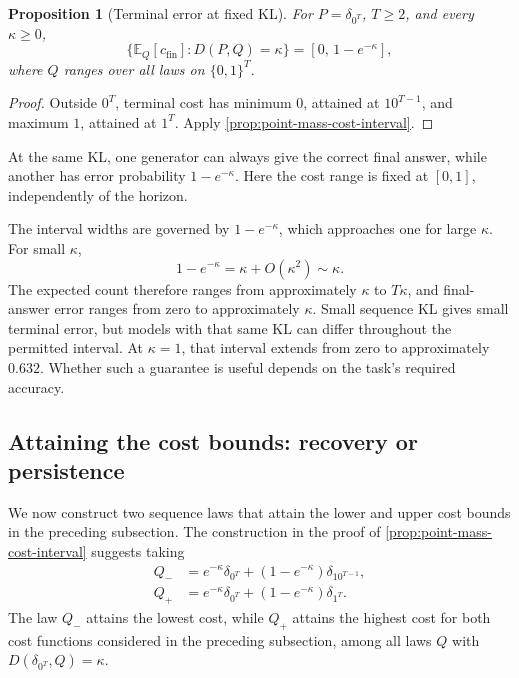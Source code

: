 \documentclass[11pt,twoside]{article}
\newcommand{\E}{\mathbb E}
\newcommand{\KL}{D}
\newtheorem{proposition}[theorem]{Proposition}
\theoremstyle{definition}
\theoremstyle{remark}
\begin{document}
\begin{proposition}[Terminal error at fixed KL]
\label{prop:terminal-moduli}
For \(P=\delta_{0^T}\), \(T\ge2\), and every \(\kappa\ge0\),
\begin{equation}
 \{\E_Q[c_{\mathrm{fin}}]:\KL(P, Q)=\kappa\}
 =[0,\,1-e^{-\kappa}],
 \label{eq:terminal-kl-level}
\end{equation}
where \(Q\) ranges over all laws on \(\{0,1\}^T\).
\end{proposition}

\begin{proof}
Outside \(0^T\), terminal cost has minimum \(0\), attained at
\(10^{T-1}\), and maximum \(1\), attained at \(1^T\).
Apply \cref{prop:point-mass-cost-interval}.
\end{proof}

At the same KL, one generator can always give the correct final answer,
while another has error probability \(1-e^{-\kappa}\). Here the cost
range is fixed at \([0,1]\), independently of the horizon.

The interval widths are governed by $1-e^{-\kappa}$, which approaches
one for large $\kappa$. For small \(\kappa\),
\[
 1-e^{-\kappa}=\kappa+O(\kappa^2)\sim\kappa.
\]
The expected count therefore ranges from approximately \(\kappa\)
to \(T\kappa\), and final-answer error ranges from zero to approximately
\(\kappa\). Small sequence KL gives small terminal error, but models
with that same KL can differ throughout the permitted interval.
At \(\kappa=1\), that interval extends from zero to approximately
\(0.632\). Whether such a guarantee is useful depends on the task's
required accuracy.

\subsection{Attaining the cost bounds: recovery or persistence}
\label{sec:endpoint-generators}
We now construct two sequence laws that attain the lower and upper cost
bounds in the preceding subsection. The construction in the proof of
\cref{prop:point-mass-cost-interval} suggests taking
\begin{equation}
 \begin{split}
 Q_-&=e^{-\kappa}\delta_{0^T}
       +(1-e^{-\kappa})\delta_{10^{T-1}},\\
 Q_+&=e^{-\kappa}\delta_{0^T}
       +(1-e^{-\kappa})\delta_{1^T}.
 \end{split}
 \label{eq:endpoint-generators}
\end{equation}
The law $Q_{-}$ attains the lowest cost, while $Q_{+}$ attains the
highest cost for both cost functions considered in the preceding
subsection, among all laws $Q$ with
$\KL(\delta_{0^T}, Q)=\kappa$.
\end{document}
